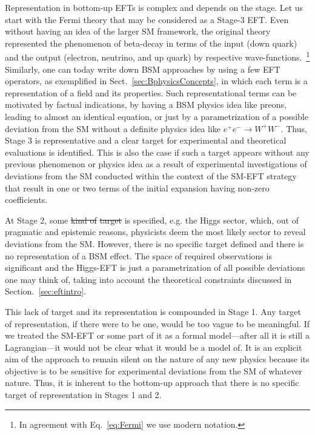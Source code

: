 Representation in bottom-up EFTs is complex and depends on the stage.
Let us start with the Fermi theory that may be considered as a Stage-3 EFT. 
Even without having an idea of the larger SM framework, the original theory represented the phenomenon of beta-decay in terms of the input (down quark) and the output (electron, neutrino, and up quark) by respective wave-functions.~\footnote{In agreement with Eq.~\ref{eq:Fermi} we use modern notation.}
Similarly, one can today write down BSM approaches by using a few EFT operators, as exemplified in Sect.~\ref{sec:BphysicsConcepts}, in which each term is a representation of a field and its properties.
Such representational terms can be motivated by factual indications, by having a BSM physics idea like preons, leading to almost an identical equation, or just by a parametrization of a possible deviation from the SM without a definite physics idea like $e^+e^-\rightarrow W^+W^-$.
Thus, Stage 3 is representative and a clear target for experimental and theoretical evaluations is identified.
This is also the case if such a target appears without any previous phenomenon or physics idea as a result of experimental investigations of deviations from the SM conducted within the context of the SM-EFT strategy that result in one or two terms of the initial expansion having non-zero coefficients.

At Stage 2, some \sout{kind of}  \sout{target}  is specified, e.g. the Higgs sector, which, 
out of pragmatic and epistemic reasons, physicists deem the most likely sector to reveal deviations from the SM.
However, there is no specific target defined and there is no representation of a BSM effect.
The space of required observations is significant and the Higgs-EFT is just a parametrization of all possible deviations one may think of, taking into account the theoretical constraints discussed in Section.~\ref{sec:eftintro}. 

This lack of  target and its representation is compounded in Stage 1. Any target of representation, if there were to be one, would be too vague to be meaningful. 
If we treated the SM-EFT or some part of it as a formal model---after all it is still a Lagrangian---it would not be clear what it would be a model of.
It is an explicit aim of the approach to remain silent on the nature of any new physics because its objective is to be sensitive for experimental deviations from the SM of whatever nature. 
Thus, it is inherent to the bottom-up approach that there is no specific target of representation in Stages 1 and 2.

